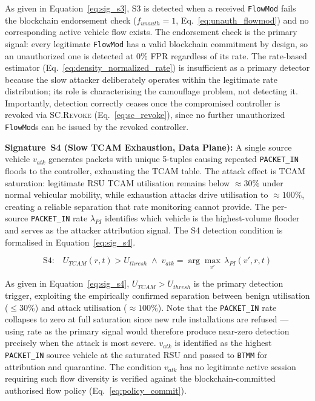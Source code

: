 \documentclass[12pt, a4paper]{report}
\begin{document}
As given in Equation~\eqref{eq:sig_s3}, S3 is detected
when a received \texttt{FlowMod} fails the blockchain
endorsement check ($f_{unauth}{=}1$,
Eq.~\ref{eq:unauth_flowmod}) and no corresponding
active vehicle flow exists. The endorsement check is
the primary signal: every legitimate \texttt{FlowMod}
has a valid blockchain commitment by design, so an
unauthorized one is detected at 0\% \ac{FPR}
regardless of its rate. The rate-based estimator
(Eq.~\ref{eq:density_normalized_rate}) is insufficient
as a primary detector because the slow attacker
deliberately operates within the legitimate rate
distribution; its role is characterising the
camouflage problem, not detecting it.
Importantly, detection correctly ceases once the
compromised controller is revoked via
\textsc{SC.Revoke} (Eq.~\ref{eq:sc_revoke}), since
no further unauthorized \texttt{FlowMod}s can be
issued by the revoked controller.

 

\textbf{Signature~S4 (Slow TCAM Exhaustion, Data Plane):}
A single source vehicle $v_{atk}$ generates packets with
unique 5-tuples causing repeated \texttt{PACKET\_IN}
floods to the controller, exhausting the \ac{TCAM} table.
The attack effect is \ac{TCAM} saturation: legitimate
\ac{RSU} \ac{TCAM} utilisation remains below $\approx
30\%$ under normal vehicular mobility, while exhaustion
attacks drive utilisation to $\approx 100\%$, creating
a reliable separation that rate monitoring cannot provide.
The per-source \texttt{PACKET\_IN} rate $\lambda_{PI}$
identifies which vehicle is the highest-volume flooder
and serves as the attacker attribution signal. The S4
detection condition is formalised in
Equation~\eqref{eq:sig_s4}.


\begin{equation}
\text{S4:}\quad
U_{TCAM}(r,t) > U_{thresh}
\;\land\;
v_{atk} = \arg\max_{v'}\,\lambda_{PI}(v',r,t)
\label{eq:sig_s4}
\end{equation}

As given in Equation~\eqref{eq:sig_s4}, $U_{TCAM}>
U_{thresh}$ is the primary detection trigger, exploiting
the empirically confirmed separation between benign
utilisation ($\leq 30\%$) and attack utilisation
($\approx 100\%$). Note that the \texttt{PACKET\_IN}
rate collapses to zero at full saturation since new
rule installations are refused --- using rate as the
primary signal would therefore produce near-zero
detection precisely when the attack is most severe.
$v_{atk}$ is identified as the highest \texttt{PACKET\_IN}
source vehicle at the saturated \ac{RSU} and passed
to \texttt{BTMM} for attribution and quarantine.
The condition $v_{atk}$ has no legitimate active session
requiring such flow diversity is verified against the
blockchain-committed authorised flow policy
(Eq.~\ref{eq:policy_commit}).
\end{document}
